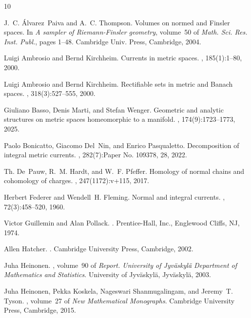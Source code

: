 \documentclass{amsart}
\numberwithin{equation}{section}
\begin{document}

\begin{thebibliography}{10}

J.~C. \'Alvarez~Paiva and A.~C. Thompson.
\newblock Volumes on normed and {F}insler spaces.
\newblock In {\em A sampler of {R}iemann-{F}insler geometry}, volume~50 of {\em Math. Sci. Res. Inst. Publ.}, pages 1--48. Cambridge Univ. Press, Cambridge, 2004.

Luigi Ambrosio and Bernd Kirchheim.
\newblock Currents in metric spaces.
, 185(1):1--80, 2000.

Luigi Ambrosio and Bernd Kirchheim.
\newblock Rectifiable sets in metric and {B}anach spaces.
, 318(3):527--555, 2000.

Giuliano Basso, Denis Marti, and Stefan Wenger.
\newblock Geometric and analytic structures on metric spaces homeomorphic to a manifold.
, 174(9):1723--1773, 2025.

Paolo Bonicatto, Giacomo Del~Nin, and Enrico Pasqualetto.
\newblock Decomposition of integral metric currents.
, 282(7):Paper No. 109378, 28, 2022.

Th. De~Pauw, R.~M. Hardt, and W.~F. Pfeffer.
\newblock Homology of normal chains and cohomology of charges.
, 247(1172):v+115, 2017.

Herbert Federer and Wendell~H. Fleming.
\newblock Normal and integral currents.
, 72(3):458--520, 1960.

Victor Guillemin and Alan Pollack.
.
\newblock Prentice-Hall, Inc., Englewood Cliffs, NJ, 1974.

Allen Hatcher.
.
\newblock Cambridge University Press, Cambridge, 2002.

Juha Heinonen.
, volume~90 of {\em Report. University of Jyv\"askyl\"a{} Department of Mathematics and Statistics}.
\newblock University of Jyv\"askyl\"a, Jyv\"askyl\"a, 2003.

Juha Heinonen, Pekka Koskela, Nageswari Shanmugalingam, and Jeremy~T. Tyson.
, volume~27 of {\em New Mathematical Monographs}.
\newblock Cambridge University Press, Cambridge, 2015.


\end{thebibliography}
\end{document}
